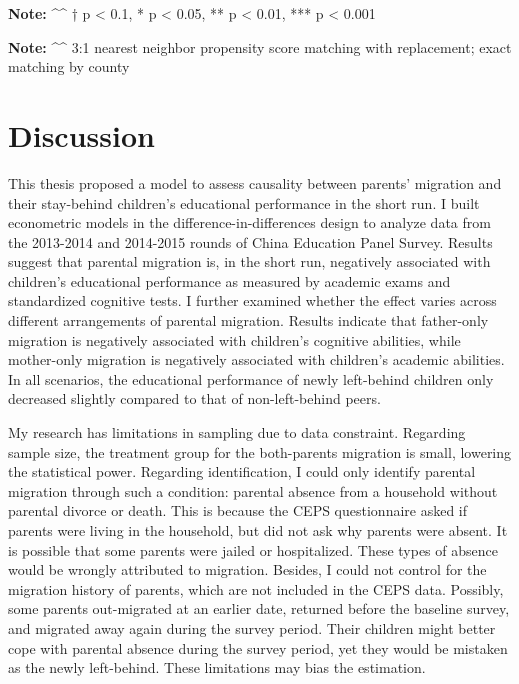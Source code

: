 \documentclass[
  man,floatsintext]{apa7}
\begin{document}
\textbf{Note:}
\^{}\^{} † p \textless{} 0.1, * p \textless{} 0.05, ** p \textless{} 0.01, *** p \textless{} 0.001

\textbf{Note:}
\^{}\^{} 3:1 nearest neighbor propensity score matching with replacement; exact matching by county

\newpage

\hypertarget{discussion}{%
\section{Discussion}\label{discussion}}

This thesis proposed a model to assess causality between parents' migration and their stay-behind children's educational performance in the short run. I built econometric models in the difference-in-differences design to analyze data from the 2013-2014 and 2014-2015 rounds of China Education Panel Survey. Results suggest that parental migration is, in the short run, negatively associated with children's educational performance as measured by academic exams and standardized cognitive tests. I further examined whether the effect varies across different arrangements of parental migration. Results indicate that father-only migration is negatively associated with children's cognitive abilities, while mother-only migration is negatively associated with children's academic abilities. In all scenarios, the educational performance of newly left-behind children only decreased slightly compared to that of non-left-behind peers.

My research has limitations in sampling due to data constraint. Regarding sample size, the treatment group for the both-parents migration is small, lowering the statistical power. Regarding identification, I could only identify parental migration through such a condition: parental absence from a household without parental divorce or death. This is because the CEPS questionnaire asked if parents were living in the household, but did not ask why parents were absent. It is possible that some parents were jailed or hospitalized. These types of absence would be wrongly attributed to migration. Besides, I could not control for the migration history of parents, which are not included in the CEPS data. Possibly, some parents out-migrated at an earlier date, returned before the baseline survey, and migrated away again during the survey period. Their children might better cope with parental absence during the survey period, yet they would be mistaken as the newly left-behind. These limitations may bias the estimation.
\end{document}
